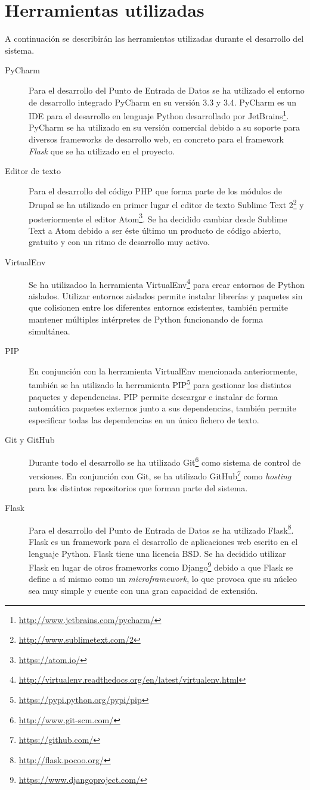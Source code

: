 \section{Herramientas utilizadas}
\label{implementacion:herramientas_utilizadas}

A continuación se describirán las herramientas utilizadas durante el desarrollo del sistema.
\begin{description}
	\item[PyCharm]
		Para el desarrollo del Punto de Entrada de Datos se ha utilizado el entorno de desarrollo integrado PyCharm en su versión 3.3 y 3.4.  PyCharm es un IDE para el desarrollo en lenguaje Python desarrollado por JetBrains\footnote{\url{http://www.jetbrains.com/pycharm/}}.  PyCharm se ha utilizado en su versión comercial debido a su soporte para diversos frameworks de desarrollo web, en concreto para el framework \textit{Flask} que se ha utilizado en el proyecto.
	\item[Editor de texto]
		Para el desarrollo del código PHP que forma parte de los módulos de Drupal se ha utilizado en primer lugar el editor de texto Sublime Text 2\footnote{\url{http://www.sublimetext.com/2}} y posteriormente el editor Atom\footnote{\url{https://atom.io/}}.  Se ha decidido cambiar desde Sublime Text a Atom debido a ser éste último un producto de código abierto, gratuito y con un ritmo de desarrollo muy activo.
	\item[VirtualEnv]
		Se ha utilizadoo la herramienta VirtualEnv\footnote{\url{http://virtualenv.readthedocs.org/en/latest/virtualenv.html}} para crear entornos de Python aislados.  Utilizar entornos aislados permite instalar librerías y paquetes sin que colisionen entre los diferentes entornos existentes, también permite mantener múltiples intérpretes de Python funcionando de forma simultánea.
	\item[PIP]
		En conjunción con la herramienta VirtualEnv mencionada anteriormente, también se ha utilizado la herramienta PIP\footnote{\url{https://pypi.python.org/pypi/pip}} para gestionar los distintos paquetes y dependencias.  PIP permite descargar e instalar de forma automática paquetes externos junto a sus dependencias, también permite especificar todas las dependencias en un único fichero de texto.
	\item[Git y GitHub]
		Durante todo el desarrollo se ha utilizado Git\footnote{\url{http://www.git-scm.com/}} como sistema de control de versiones.  En conjunción con Git, se ha utilizado GitHub\footnote{\url{https://github.com/}} como \textit{hosting} para los distintos repositorios que forman parte del sistema.
	\item[Flask]
		Para el desarrollo del Punto de Entrada de Datos se ha utilizado Flask\footnote{\url{http://flask.pocoo.org/}}. Flask es un framework para el desarrollo de aplicaciones web escrito en el lenguaje Python.  Flask tiene una licencia BSD.  Se ha decidido utilizar Flask en lugar de otros frameworks como Django\footnote{\url{https://www.djangoproject.com/}} debido a que Flask se define a sí mismo como un \textit{microframework}, lo que provoca que su núcleo sea muy simple y cuente con una gran capacidad de extensión.
\end{description}


